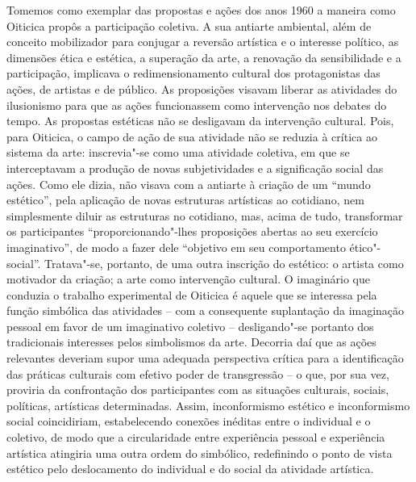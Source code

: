 Tomemos como exemplar das propostas e ações dos anos 1960 a maneira como
Oiticica propôs a participação coletiva. A sua antiarte ambiental, além
de conceito mobilizador para conjugar a reversão artística e o interesse
político, as dimensões ética e estética, a superação da arte, a
renovação da sensibilidade e a participação, implicava o
redimensionamento cultural dos protagonistas das ações, de artistas e de
público. As proposições visavam liberar as atividades do ilusionismo
para que as ações funcionassem como intervenção nos debates do tempo. As
propostas estéticas não se desligavam da intervenção cultural. Pois,
para Oiticica, o campo de ação de sua atividade não se reduzia à crítica
ao sistema da arte: inscrevia"-se como uma atividade coletiva, em que se
interceptavam a produção de novas subjetividades e a significação social
das ações. Como ele dizia, não visava com a antiarte à criação de um
``mundo estético'', pela aplicação de novas estruturas artísticas ao
cotidiano, nem simplesmente diluir as estruturas no cotidiano, mas,
acima de tudo, transformar os participantes ``proporcionando"-lhes
proposições abertas ao seu exercício imaginativo'', de modo a fazer dele
``objetivo em seu comportamento ético"-social''. Tratava"-se, portanto, de
uma outra inscrição do estético: o artista como motivador da criação; a
arte como intervenção cultural. O imaginário que conduzia o trabalho
experimental de Oiticica é aquele que se interessa pela função simbólica
das atividades -- com a consequente suplantação da imaginação pessoal em
favor de um imaginativo coletivo -- desligando"-se portanto dos
tradicionais interesses pelos simbolismos da arte. Decorria daí que as
ações relevantes deveriam supor uma adequada perspectiva crítica para a
identificação das práticas culturais com efetivo poder de transgressão
-- o que, por sua vez, proviria da confrontação dos participantes com as
situações culturais, sociais, políticas, artísticas determinadas. Assim,
inconformismo estético e inconformismo social coincidiriam,
estabelecendo conexões inéditas entre o individual e o coletivo, de modo
que a circularidade entre experiência pessoal e experiência artística
atingiria uma outra ordem do simbólico, redefinindo o ponto de vista
estético pelo deslocamento do individual e do social da atividade
artística.


